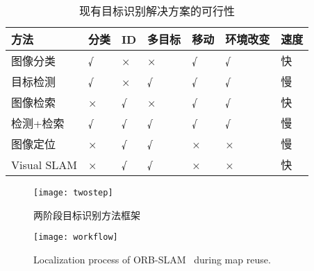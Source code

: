 \begin{table}[htbp]
    \centering
    \caption{\label{table:methods}现有目标识别解决方案的可行性}
    \begin{tabular}{|l|l|l|l|l|l|l|}\hline
    方法 &
      分类 &
      ID &
      多目标 &
      移动 &
      环境改变 &
      速度 \\
      \hline 图像分类\cite{he2019bag} &
      {\color[HTML]{355421} √} &
      {\color[HTML]{BF0000} ×} &
      {\color[HTML]{BF0000} ×} &
      {\color[HTML]{355421} √} &
      {\color[HTML]{355421} √} &
      {\color[HTML]{355421} 快} \\ \hline
    目标检测\cite{zou2019object} &
      {\color[HTML]{355421} √} &
      {\color[HTML]{BF0000} ×} &
      {\color[HTML]{355421} √} &
      {\color[HTML]{355421} √} &
      {\color[HTML]{355421} √} &
      {\color[HTML]{BF0000} 慢} \\ \hline
    图像检索\cite{philbin2008lost,zheng2017sift} &
      {\color[HTML]{BF0000} ×} &
      {\color[HTML]{355421} √} &
      {\color[HTML]{BF0000} ×} &
      {\color[HTML]{355421} √} &
      {\color[HTML]{355421} √} &
      {\color[HTML]{355421} 快} \\ \hline
    检测+检索 &
      {\color[HTML]{355421} √} &
      {\color[HTML]{355421} √} &
      {\color[HTML]{355421} √} &
      {\color[HTML]{355421} √} &
      {\color[HTML]{355421} √} &
      {\color[HTML]{BF0000} 慢} \\ \hline
    图像定位\cite{sattler2011fast} &
      {\color[HTML]{BF0000} ×} &
      {\color[HTML]{355421} √} &
      {\color[HTML]{355421} √} &
      {\color[HTML]{BF0000} ×} &
      {\color[HTML]{BF0000} ×} &
      {\color[HTML]{BF0000} 慢} \\ \hline
    Visual SLAM\cite{liu2021edgesharing} &
      {\color[HTML]{BF0000} ×} &
      {\color[HTML]{355421} √} &
      {\color[HTML]{355421} √} &
      {\color[HTML]{BF0000} ×} &
      {\color[HTML]{BF0000} ×} &
      {\color[HTML]{355421} 快} \\ \hline
    \end{tabular}
    \end{table}

    \begin{figure}[t]
        \centering
        \texttt{[image: twostep]}
        \caption{两阶段目标识别方法框架}
        \label{fig:two-step-workflow}
    \end{figure}

    \begin{figure}[t]
        \centering
        \texttt{[image: workflow]}
        \caption{Localization process of ORB-SLAM~\cite{mur2017orb} during map reuse.}
        \label{fig:localization}
    \end{figure}
